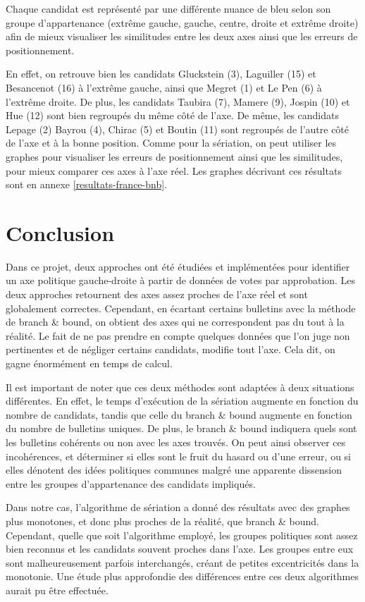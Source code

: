 \documentclass[11pt, a4paper]{article}
\begin{document}
Chaque candidat est représenté par une différente nuance de bleu selon son groupe d'appartenance (extrême gauche, gauche, centre, droite et extrême droite) afin de mieux visualiser les similitudes entre les deux axes ainsi que les erreurs de positionnement.

En effet, on retrouve bien les candidats Gluckstein (3), Laguiller (15) et Besancenot (16) à l'extrême gauche, ainsi que Megret (1) et Le Pen (6) à l'extrême droite. De plus, les candidats Taubira (7), Mamere (9), Jospin (10) et Hue (12) sont bien regroupés du même côté de l'axe. De même, les candidats Lepage (2) Bayrou (4), Chirac (5) et Boutin (11) sont regroupés de l'autre côté de l'axe et à la bonne position. Comme pour la sériation, on peut utiliser les graphes pour visualiser les erreurs de positionnement ainsi que les similitudes, pour mieux comparer ces axes à l'axe réel. Les graphes décrivant ces résultats sont en annexe \ref{resultats-france-bnb}.

\section*{Conclusion}

Dans ce projet, deux approches ont été étudiées et implémentées pour identifier un axe politique gauche-droite à partir de données de votes par approbation. Les deux approches retournent des axes assez proches de l'axe réel et sont globalement correctes. Cependant, en écartant certains bulletins avec la méthode de branch \& bound, on obtient des axes qui ne correspondent pas du tout à la réalité. Le fait de ne pas prendre en compte quelques données que l'on juge non pertinentes et de négliger certains candidats, modifie tout l'axe. Cela dit, on gagne énormément en temps de calcul.

Il est important de noter que ces deux méthodes sont adaptées à deux situations différentes. En effet, le temps d'exécution de la sériation augmente en fonction du nombre de candidats, tandis que celle du branch \& bound augmente en fonction du nombre de bulletins uniques. De plus, le branch \& bound indiquera quels sont les bulletins cohérents ou non avec les axes trouvés. On peut ainsi observer ces incohérences, et déterminer si elles sont le fruit du hasard ou d'une erreur, ou si elles dénotent des idées politiques communes malgré une apparente dissension entre les groupes d'appartenance des candidats impliqués. 

Dans notre cas, l'algorithme de sériation a donné des résultats avec des graphes plus monotones, et donc plus proches de la réalité, que branch \& bound. Cependant, quelle que soit l'algorithme employé, les groupes politiques sont assez bien reconnus et les candidats souvent proches dans l'axe. Les groupes entre eux sont malheureusement parfois interchangés, créant de petites excentricités dans la monotonie. Une étude plus approfondie des différences entre ces deux algorithmes aurait pu être effectuée.
\end{document}
